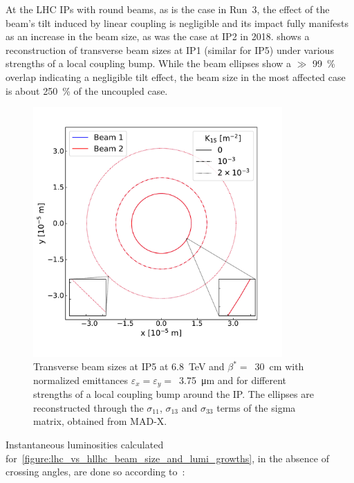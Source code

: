 At the LHC IPs with round beams, as is the case in Run~\num{3}, the effect of the beam's tilt induced by linear coupling is negligible and its impact fully manifests as an increase in the beam size, as was the case at IP\num{2} in \num{2018}.
 shows a reconstruction of transverse beam sizes at IP\num{1} (similar for IP\num{5}) under various strengths of a local coupling bump.
While the beam ellipses show a \(\gg\) \qty{99}{\percent} overlap indicating a negligible tilt effect, the beam size in the most affected case is about \qty{250}{\percent} of the uncoupled case.

\begin{figure}[!htb]
    \centering
    \includegraphics*[width=0.85\textwidth]{Figures/IR_Coupling_Correction/ellipses_various_coupling_bumps.pdf}
    \caption{Transverse beam sizes at IP\num{5} at \qty{6.8}{\tera\electronvolt} and \(\beta^{\ast}=\)~\qty{30}{\centi\meter} with normalized emittances \(\varepsilon_x = \varepsilon_y =\)~\qty{3.75}{\micro\meter} and for different strengths of a local coupling bump around the IP. The ellipses are reconstructed through the \(\sigma_{11}\), \(\sigma_{13}\) and \(\sigma_{33}\) terms of the sigma matrix, obtained from MAD-X.}
    \label{figure:ip_ellipses_from_coupling}
\end{figure}
\break

Instantaneous luminosities calculated for~\cref{figure:lhc_vs_hllhc_beam_size_and_lumi_growths}, in the absence of crossing angles, are done so according to~\cite{CERN:Herr:Concept_Luminosity}:

